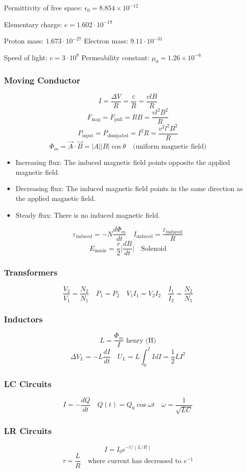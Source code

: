 \documentclass[8pt,twocolumn]{extarticle}
\begin{document}
Permittivity of free space: $\epsilon_0 = 8.854\times 10^{-12}$

Elementary charge: $e = 1.602\cdot 10^{-19}$

Proton mass: $1.673\cdot 10^{-27}$
Electron mass: $9.11\cdot 10^{-31}$

Speed of light: $c=3\cdot 10^8$
Permeability constant: $\mu_0 = 1.26\times 10^{-6}$
\subsubsection*{Moving Conductor}
\[I = \frac{\Delta V}{R} = \frac{\varepsilon}{R} = \frac{vlB}{R}\]
\[F_\text{mag}=F_\text{pull}=IlB=\frac{vl^2 B^2}{R}\]
\[P_\text{input}=P_\text{dissipated}=I^2 R=\frac{v^2 l^2 B^2}{R}\]
\[\Phi_m = \vec{A}\cdot\vec{B}=|A||B|\cos\theta\quad\text{(uniform magnetic field)}\]

\begin{itemize}
    \item Increasing flux: The induced magnetic field points opposite the applied magnetic
    field.
    \item Decreasing flux: The induced magnetic field points in the same direction as the
    applied magnetic field.
    \item Steady flux: There is no induced magnetic field.
\end{itemize}
\[\varepsilon_\text{induced} = -N\frac{d\Phi_m}{dt}\quad I_\text{induced}=
\frac{\varepsilon_\text{induced}}{R}\]
\[E_\text{inside}=\frac{r}{2}\Big|\frac{dB}{dt}\Big|\quad\text{Solenoid}\]
\subsubsection*{Transformers}
\[\frac{V_2}{V_1} = \frac{N_2}{N_1}\quad P_1=P_2\quad V_1 I_1 = V_2 I_2\quad
\frac{I_1}{I_2}=\frac{N_2}{N_1}\]
\subsubsection*{Inductors}
\[L=\frac{\Phi_m}{I}\text{ henry (H)}\]
\[\Delta V_L = -L\frac{dI}{dt}\quad U_L = L\int_{0}^{I}IdI = \frac{1}{2}LI^2\]
\subsubsection*{LC Circuits}
\[I=-\frac{dQ}{dt}\quad Q(t)=Q_0\cos\omega t\quad \omega = \frac{1}{\sqrt{LC}}\]
\subsubsection*{LR Circuits}
\[I=I_0 e^{-t/(L / R)}\]
\[\tau = \frac{L}{R}\quad\text{where current has decreased to }e^{-1}\]
\end{document}
